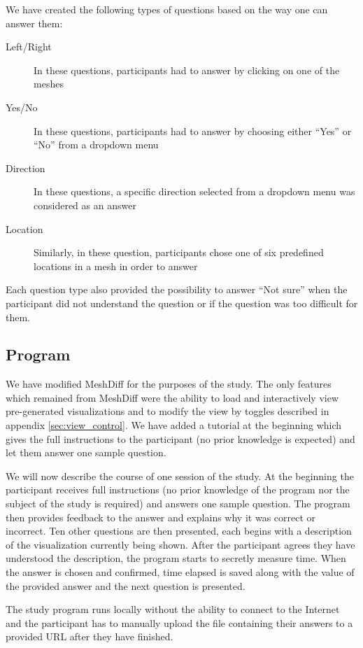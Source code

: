We have created the following types of questions based on the way one can answer them:

\begin{description}
\item [Left/Right] In these questions, participants had to answer by clicking on one of the meshes
\item [Yes/No] In these questions, participants had to answer by choosing either ``Yes'' or ``No'' from a dropdown menu
\item [Direction] In these questions, a specific direction selected from a dropdown menu was considered as an answer
\item [Location] Similarly, in these question, participants chose one of six predefined locations in a mesh in order to answer
\end{description}

Each question type also provided the possibility to answer ``Not sure'' when the participant did not understand the question or if the question was too difficult for them.

\subsection{Program}

We have modified MeshDiff for the purposes of the study. The only features which remained from MeshDiff were the ability to load and interactively view pre-generated visualizations and to modify the view by toggles described in appendix \ref{sec:view_control}. We have added a tutorial at the beginning which gives the full instructions to the participant (no prior knowledge is expected) and let them answer one sample question. 

We will now describe the course of one session of the study. At the beginning the participant receives full instructions (no prior knowledge of the program nor the subject of the study is required) and answers one sample question. The program then provides feedback to the answer and explains why it was correct or incorrect. Ten other questions are then presented, each begins with a description of the visualization currently being shown. After the participant agrees they have understood the description, the program starts to secretly measure time. When the answer is chosen and confirmed, time elapsed is saved along with the value of the provided answer and the next question is presented.

The study program runs locally without the ability to connect to the Internet and the participant has to manually upload the file containing their answers to a provided URL after they have finished.


